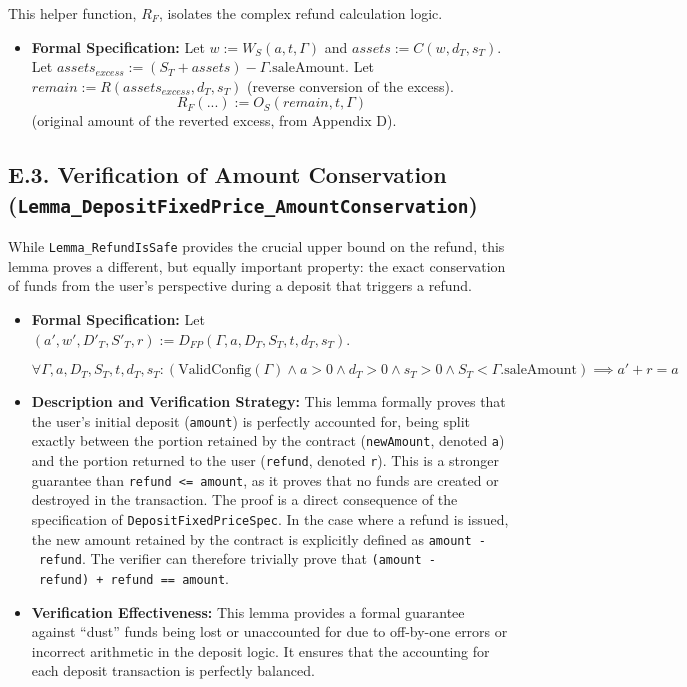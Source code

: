 \documentclass[
  english,
  onecolumn]{article}
\providecommand{\tightlist}{%
  \setlength{\itemsep}{0pt}\setlength{\parskip}{0pt}}
\begin{document}
This helper function, \(R_F\), isolates the complex refund calculation
logic.

\begin{itemize}
\tightlist
\item
  \textbf{Formal Specification:} Let \(w := W_S(a, t, \Gamma)\) and
  \(assets := C(w, d_T, s_T)\). Let
  \(assets_{excess} := (S_T + assets) - \Gamma.\text{saleAmount}\). Let
  \(remain := R(assets_{excess}, d_T, s_T)\) (reverse conversion of the
  excess). \[
  R_F(...) := O_S(remain, t, \Gamma)
  \] (original amount of the reverted excess, from Appendix D).
\end{itemize}

\subsection{\texorpdfstring{E.3. Verification of Amount Conservation
(\texttt{Lemma\_DepositFixedPrice\_AmountConservation})}{E.3. Verification of Amount Conservation (Lemma\_DepositFixedPrice\_AmountConservation)}}\label{e.3.-verification-of-amount-conservation-lemma_depositfixedprice_amountconservation}

While \texttt{Lemma\_RefundIsSafe} provides the crucial upper bound on
the refund, this lemma proves a different, but equally important
property: the exact conservation of funds from the user's perspective
during a deposit that triggers a refund.

\begin{itemize}
\item
  \textbf{Formal Specification:} Let
  \((a', w', D'_T, S'_T, r) := D_{FP}(\Gamma, a, D_T, S_T, t, d_T, s_T)\).

  \(\forall \Gamma, a, D_T, S_T, t, d_T, s_T : (\text{ValidConfig}(\Gamma) \land a > 0 \land d_T > 0 \land s_T > 0 \land S_T < \Gamma.\text{saleAmount}) \implies a' + r = a\)
\item
  \textbf{Description and Verification Strategy:} This lemma formally
  proves that the user's initial deposit (\texttt{amount}) is perfectly
  accounted for, being split exactly between the portion retained by the
  contract (\texttt{newAmount}, denoted \texttt{a\textquotesingle{}})
  and the portion returned to the user (\texttt{refund}, denoted
  \texttt{r}). This is a stronger guarantee than
  \texttt{refund\ \textless{}=\ amount}, as it proves that no funds are
  created or destroyed in the transaction. The proof is a direct
  consequence of the specification of \texttt{DepositFixedPriceSpec}. In
  the case where a refund is issued, the new amount retained by the
  contract is explicitly defined as \texttt{amount\ -\ refund}. The
  verifier can therefore trivially prove that
  \texttt{(amount\ -\ refund)\ +\ refund\ ==\ amount}.
\item
  \textbf{Verification Effectiveness:} This lemma provides a formal
  guarantee against ``dust'' funds being lost or unaccounted for due to
  off-by-one errors or incorrect arithmetic in the deposit logic. It
  ensures that the accounting for each deposit transaction is perfectly
  balanced.
\end{itemize}
\end{document}
